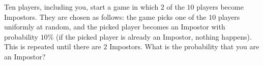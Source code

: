 Ten players, including you, start a game in which $2$ of the $10$ players become Impostors. They are chosen as follows: the game picks one of the $10$ players uniformly at random, and the picked player becomes an Impostor with probability $10\%$ (if the picked player is already an Impostor, nothing happens). This is repeated until there are $2$ Impostors. What is the probability that you are an Impostor?
